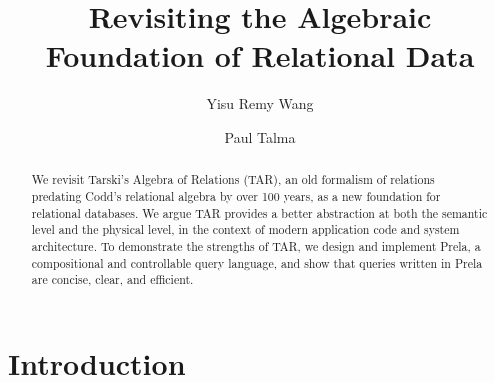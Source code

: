 \documentclass[sigconf,screen,pbalance]{cidr-2027}
\newcommand{\noun}[1]{\textsf{#1}}
\begin{document}
\title{Revisiting the Algebraic Foundation of Relational Data}

\author{Yisu Remy Wang}

\author{Paul Talma}

\begin{abstract}
We revisit Tarski's Algebra of Relations (\noun{TAR}), an old formalism of relations predating Codd's relational algebra by over 100 years, as a new foundation for relational databases.
We argue \noun{TAR} provides a better abstraction at both the semantic level and the physical level, in the context of modern application code and system architecture.
To demonstrate the strengths of \noun{TAR}, we design and implement Prela, a compositional and controllable query language, and show that queries written in Prela are concise, clear, and efficient.
\end{abstract}

\maketitle

\section{Introduction}\label{sec-intro}
\end{document}
